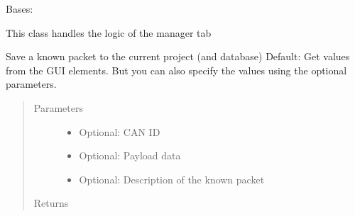 \documentclass[letterpaper,10pt,english]{sphinxmanual}
\begin{document}
\begin{fulllineitems}
\label{\detokenize{src:src.ManagerTab.ManagerTab}}
Bases: {\hyperref[\detokenize{src:src.AbstractTab.AbstractTab}]{}}

This class handles the logic of the manager tab

\begin{fulllineitems}
\label{\detokenize{src:src.ManagerTab.ManagerTab.__init__}}
\end{fulllineitems}


\begin{fulllineitems}
\label{\detokenize{src:src.ManagerTab.ManagerTab.addKnownPacket}}
Save a known packet to the current project (and database)
Default: Get values from the GUI elements. But you can also specify the values
using the optional parameters.
\begin{quote}\begin{description}
\item[{Parameters}] \leavevmode\begin{itemize}
\item {} 
 \textendash{} Optional: CAN ID

\item {} 
 \textendash{} Optional: Payload data

\item {} 
 \textendash{} Optional: Description of the known packet

\end{itemize}

\item[{Returns}] \leavevmode


\end{description}\end{quote}

\end{fulllineitems}



\end{fulllineitems}
\end{document}
